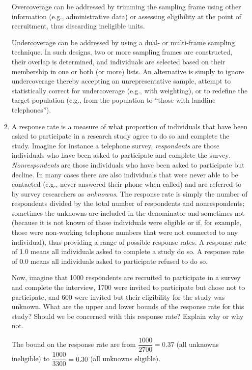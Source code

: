 \documentclass[a4paper]{exam}
\begin{document}
\begin{enumerate}
\begin{solution}
Overcoverage can be addressed by trimming the sampling frame using other information (e.g., administrative data) or assessing eligibility at the point of recruitment, thus discarding ineligible units.

Undercoverage can be addressed by using a dual- or multi-frame sampling technique. In such designs, two or more sampling frames are constructed, their overlap is determined, and individuals are selected based on their membership in one or both (or more) lists. An alternative is simply to ignore undercoverage thereby accepting an unrepresentative sample, attempt to statistically correct for undercoverage (e.g., with weighting), or to redefine the target population (e.g., from the population to ``those with landline telephones'').

\end{solution}

\item A response rate is a measure of what proportion of individuals that have been asked to participate in a research study agree to do so and complete the study. Imagine for instance a telephone survey, \textit{respondents} are those individuals who have been asked to participate and complete the survey. \textit{Nonrespondents} are those individuals who have been asked to participate but decline. In many cases there are also individuals that were never able to be contacted (e.g., never answered their phone when called) and are referred to by survey researchers as \textit{unknowns}. The response rate is simply the number of respondents divided by the total number of respondents and nonrespondents; sometimes the unknowns are included in the denominator and sometimes not (because it is not known of those individuals were eligible or if, for example, those were non-working telephone numbers that were not connected to any individual), thus providing a range of possible response rates. A response rate of 1.0 means all individuals asked to complete a study do so. A response rate of 0.0 means all individuals asked to participate refused to do so.
 
Now, imagine that 1000 respondents are recruited to participate in a survey and complete the interview, 1700 were invited to participate but chose not to participate, and 600 were invited but their eligibility for the study was unknown. What are the upper and lower bounds of the response rate for this study? Should we be concerned with this response rate? Explain why or why not.

\begin{solution}
The bound on the response rate are from $\dfrac{1000}{2700} = 0.37$ (all unknowns ineligible) to $\dfrac{1000}{3300} = 0.30$ (all unknowns eligible).


\end{solution}
\end{enumerate}
\end{document}
